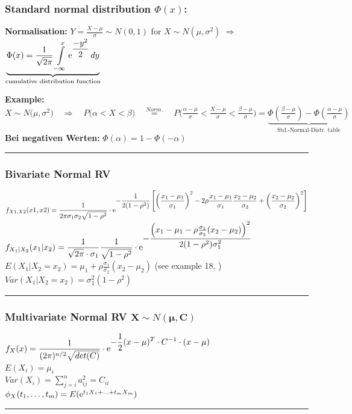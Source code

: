 \subsubsection{Standard normal distribution $\Phi(x)$:}

\textbf{Normalisation:} $Y=\frac{X-\mu}{\sigma}\sim N(0,1)$ \qquad for \qquad $X\sim N(\mu,\sigma^2)$ \qquad $\Rightarrow$ \qquad
$\underbrace{\Phi(x)=\displaystyle\frac 1 {\sqrt{2\pi}}\int\limits_{-\infty}^x{\displaystyle\operatorname{\mathrm e}^{\displaystyle\frac{-y^2}{2}}dy} }_{\text{cumulative distribution function}}$\\

\vspace{0.5cm}

\textbf{Example:} $X\sim N\big(\mu,\sigma^2\big)\quad \Rightarrow \quad P\big(\alpha<X<\beta\big)\quad\overset{Norm.}{=}\quad P\big(\frac{\alpha-\mu}{\sigma}<\frac{X-\mu}{\sigma}<\frac{\beta-\mu}{\sigma}\big)=\underbrace{\Phi\left(\frac{\beta-\mu}{\sigma}\right)-\Phi\left(\frac{\alpha-\mu}{\sigma}\right)}\limits_{\text{Std.-Normal-Distr. table}}$\\
\textbf{Bei negativen Werten:} $\boxed{\Phi(\alpha)=1-\Phi(-\alpha)}$


\vspace{2mm}
\hrule

\subsubsection{Bivariate Normal RV }

$f_{X1,X2}(x1,x2)=\displaystyle\frac{1}{2\pi\sigma_1\sigma_2\sqrt{1-\rho^2}}\cdot\operatorname{\mathrm e}^{\displaystyle-\frac{1}{2(1-\rho^2)}\left[\left(\frac{x_1-\mu_1}{\sigma_1}\right)^2-2\rho\frac{x_1-\mu_1}{\sigma_1}\frac{x_2-\mu_2}{\sigma_2}+\left(\frac{x_2-\mu_2}{\sigma_2}\right)^2\right]}$\\

$f_{X_1|X_2}(x_1|x_2)=\displaystyle\frac{1}{\sqrt{2\pi}\cdot \sigma_1}\frac{1}{\sqrt{1-\rho^2}}\cdot\operatorname{\mathrm e}^{\displaystyle-\frac{\left(x_1-\mu_1-\rho\frac{\sigma_1}{\sigma_2}(x_2-\mu_2)\right)^2}{2(1-\rho^2)\sigma_1^2}}$\\

$E(X_1|X_2=x_2)=\mu_1+\rho\frac{\sigma_1}{\sigma_2}(x_2-\mu_2)$ (see example 18, )\\
$Var(X_1|X_2=x_2)=\sigma_1^2(1-\rho^2)$

\vspace{2mm}
\hrule

\subsubsection{Multivariate Normal RV $\mathbf{X} \sim N(\mathbf{\mu},\mathbf{C})$}
$f_X(x)=\displaystyle\frac{1}{(2\pi)^{n/2}\sqrt{det(C)}}\cdot\operatorname{\mathrm e}^{\displaystyle-\frac{1}{2}(x-\mu)^T\cdot C^{-1}\cdot(x-\mu)}$\\
$E(X_i)=\mu_i$\\
$Var(X_i)=\sum\limits_{j=i}^n{a_{ij}^2=C_{ii}}$\\
$\phi_X(t_1,\ldots,t_m)=E(\operatorname{\mathrm e}^{t_1X_1+\ldots+t_mX_m})$

\vspace{2mm}
\hrule
